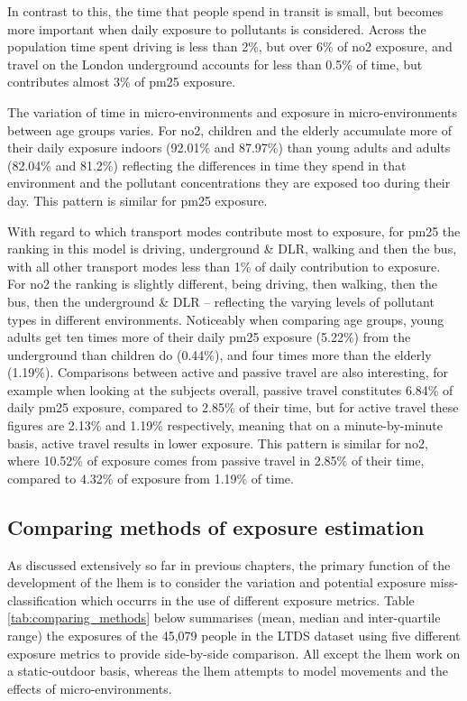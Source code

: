 In contrast to this, the time that people spend in transit is small, but becomes more important when daily exposure to pollutants is considered. Across the population time spent driving is less than 2\%, but over 6\% of \gls{no2} exposure, and travel on the London underground accounts for less than 0.5\% of time, but contributes almost 3\% of \gls{pm25} exposure.

The variation of time in micro-environments and exposure in micro-environments between age groups varies. For \gls{no2}, children and the elderly accumulate more of their daily exposure indoors (92.01\% and 87.97\%) than young adults and adults (82.04\% and 81.2\%) reflecting the differences in time they spend in that environment and the pollutant concentrations they are exposed too during their day. This pattern is similar for \gls{pm25} exposure.

With regard to which transport modes contribute most to exposure, for \gls{pm25} the ranking in this model is driving, underground \& DLR, walking and then the bus, with all other transport modes less than 1\% of daily contribution to exposure. For \gls{no2} the ranking is slightly different, being driving, then walking, then the bus, then the underground \& DLR -- reflecting the varying levels of pollutant types in different environments. Noticeably when comparing age groups, young adults get ten times more of their daily \gls{pm25} exposure (5.22\%) from the underground than children do (0.44\%), and four times more than the elderly (1.19\%). Comparisons between active and passive travel are also interesting, for example when looking at the subjects overall, passive travel constitutes 6.84\% of daily \gls{pm25} exposure, compared to 2.85\% of their time, but for active travel these figures are 2.13\% and 1.19\% respectively, meaning that on a minute-by-minute basis, active travel results in lower exposure. This pattern is similar for \gls{no2}, where 10.52\% of exposure comes from passive travel in 2.85\% of their time, compared to 4.32\% of exposure from 1.19\% of time.

\subsection{Comparing methods of exposure estimation}
\label{subsec:comparing_exposure_methods}

As discussed extensively so far in previous chapters, the primary function of the development of the \gls{lhem} is to consider the variation and potential exposure miss-classification which occurrs in the use of different exposure metrics. Table \ref{tab:comparing_methods} below summarises (mean, median and inter-quartile range) the exposures of the 45,079 people in the LTDS dataset using five different exposure metrics to provide side-by-side comparison. All except the \gls{lhem} work on a static-outdoor basis, whereas the \gls{lhem} attempts to model movements and the effects of micro-environments.

